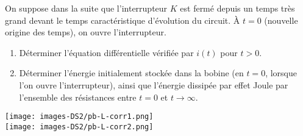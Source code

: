 On suppose dans la suite que l'interrupteur \(K\) est fermé depuis un
temps très grand devant le temps caractéristique d'évolution du circuit.
À \(t = 0\) (nouvelle origine des temps), on ouvre l'interrupteur.

\begin{enumerate}
\def\labelenumi{\arabic{enumi}.}
\setcounter{enumi}{5}
\item
  Déterminer l'équation différentielle vérifiée par \(i(t)\) pour
  \(t>0\).
\item
  Déterminer l'énergie initialement stockée dans la bobine (en
  \(t = 0\), lorsque l'on ouvre l'interrupteur), ainsi que l'énergie
  dissipée par effet Joule par l'ensemble des résistances entre
  \(t = 0\) et \(t \to\infty\).
\end{enumerate}

\texttt{[image: images-DS2/pb-L-corr1.png]}\\
\texttt{[image: images-DS2/pb-L-corr2.png]}

